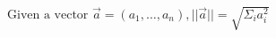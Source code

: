 


$
\text{Given a vector } \vec{a}=(a_1, \ldots , a_n), ||\vec{a}|| = \sqrt{\Sigma_i a_i^2}
$


\endinput

